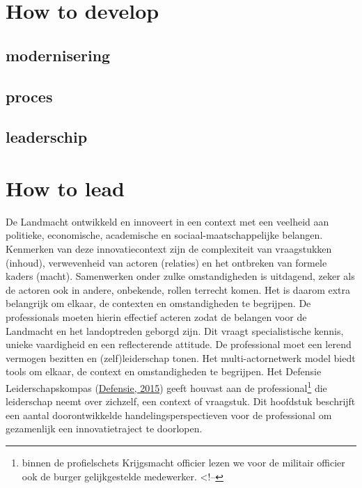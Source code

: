 \documentclass[
]{book}
\begin{document}
\hypertarget{how-to-develop}{%
\chapter{How to develop}\label{how-to-develop}}

\hypertarget{modernisering}{%
\section{modernisering}\label{modernisering}}

\hypertarget{proces}{%
\section{proces}\label{proces}}

\hypertarget{leaderschip}{%
\section{leaderschip}\label{leaderschip}}

\hypertarget{how-to-lead}{%
\chapter{\texorpdfstring{How to lead }{How to lead }}\label{how-to-lead}}

De Landmacht ontwikkeld en innoveert in een context met een veelheid aan politieke, economische, academische en sociaal-maatschappelijke belangen. Kenmerken van deze innovatiecontext zijn de complexiteit van vraagstukken (inhoud), verwevenheid van actoren (relaties) en het ontbreken van formele kaders (macht).
Samenwerken onder zulke omstandigheden is uitdagend, zeker als de actoren ook in andere, onbekende, rollen terrecht komen. Het is daarom extra belangrijk om elkaar, de contexten en omstandigheden te begrijpen. De professionals moeten hierin effectief acteren zodat de belangen voor de Landmacht en het landoptreden geborgd zijn.
Dit vraagt specialistische kennis, unieke vaardigheid en een reflecterende attitude. De professional moet een lerend vermogen bezitten en (zelf)leiderschap tonen.
Het multi-actornetwerk model biedt tools om elkaar, de context en omstandigheden te begrijpen.
Het Defensie Leiderschapskompas (\protect\hyperlink{ref-ministerie_van_defensie_visie_2015}{Defensie, 2015}) geeft houvast aan de professional\footnote{binnen de profielschets Krijgsmacht officier lezen we voor de militair officier ook de burger gelijkgestelde medewerker.
  \textless!--} die leiderschap neemt over zichzelf, een context of vraagstuk.
Dit hoofdstuk beschrijft een aantal doorontwikkelde handelingsperspectieven voor de professional om gezamenlijk een innovatietraject te doorlopen.
\end{document}

